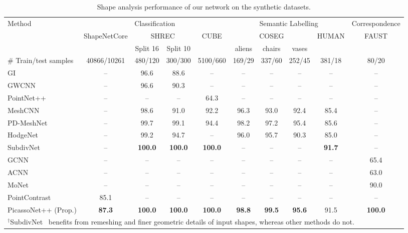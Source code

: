 \begin{table*}[!t]
\centering
\caption{\color{black}Shape analysis performance of our network on the synthetic datasets. 
}
\label{tab:shape_analysis}
\begin{adjustbox}{width=0.9\textwidth}
{
\begin{tabular}{l|c|c|c|c|c|c|c|c|c}
\hline
\multirow{3}{*}{Method}& \multicolumn{4}{c|}{Classification} & \multicolumn{4}{c|}{Semantic Labelling} & Correspondence \\
\cline{2-4}\cline{5-10} 
& \multirow{2}{*}{ShapeNetCore}& \multicolumn{2}{c|}{SHREC} & \multirow{2}{*}{CUBE} &  \multicolumn{3}{c|}{COSEG} & \multirow{2}{*}{HUMAN} &  \multirow{2}{*}{FAUST} \\
 \cline{3-4}\cline{6-8} 
 & & Split 16 & Split 10 &&  aliens & chairs & vases &  & \\
 \hline
 \# Train/test samples &40866/10261 &480/120 & 300/300& 5100/660& 169/29&337/60 & 252/45& 381/18& 80/20\\
 \hline
GI \cite{sinha2016deep} & --& 96.6& 88.6& -- &  --& --& --&  --&--\\
GWCNN \cite{ezuz2017gwcnn} & --& 96.6& 90.3& -- &  --& --& --&  --&--\\
PointNet++ \cite{qi2017pointnetplusplus} & --& --& --& 64.3 &   --& --& --& --&--\\
 MeshCNN \cite{hanocka2019meshcnn} & --& 98.6& 91.0& 92.2 &  96.3& 93.0& 92.4& 85.4&--\\
 PD-MeshNet \cite{milano2020primal} & --& 99.7& 99.1& 94.4&  98.2& 97.2& 95.4 & 85.6&--\\
 {\color{black}HodgeNet~\cite{smirnov2021hodgenet}} & -- & 99.2& 94.7& --&  96.0& 95.7& 90.3 & 85.0&--\\ 
 {\color{black}SubdivNet~\cite{hu2022subdivision}} &-- & \textbf{100.0}& \textbf{100.0}& \textbf{100.0}&  --& --& -- & \textbf{91.7}&--\\ 
 GCNN \cite{masci2015geodesic}& --& --& -- & --& --& --& --&  --& 65.4\\
ACNN \cite{boscaini2016learning}& --& --&-- & --& --& --& --&  --& 63.0 \\
MoNet \cite{monti2017geometric} & --& --& -- & --& --& --& --&  --& 90.0\\
PointContrast \cite{monti2017geometric} & 85.1&--& --& -- & --& --& --& --&  --\\
\hline
{\color{black}PicassoNet++ (Prop.)} &\textbf{87.3}&\textbf{100.0} & \textbf{100.0}& \textbf{100.0} &
\textbf{98.8} & \textbf{99.5} & \textbf{95.6} & 91.5 &
\textbf{100.0}\\
\hline
\multicolumn{10}{l}{$^{\dagger}$SubdivNet~\cite{hu2022subdivision} benefits from remeshing and finer geometric details of input shapes, whereas other methods do not.}
\end{tabular}
}
\end{adjustbox}
\end{table*}

